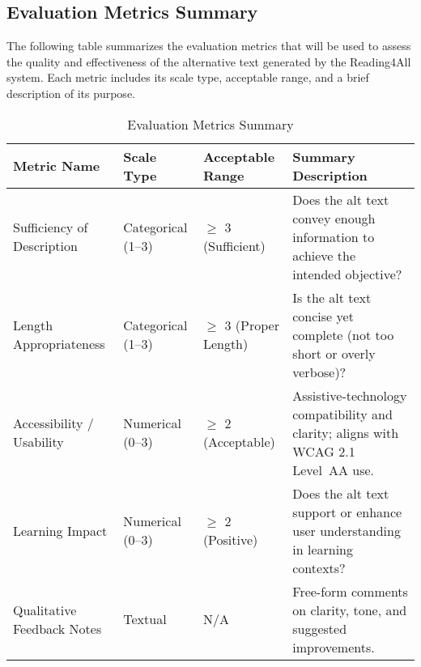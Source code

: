 \documentclass[12pt, titlepage]{article}
\begin{document}
\subsection{Evaluation Metrics Summary}
\label{appendix:evaluation-metrics}
The following table summarizes the evaluation metrics that will be used to assess the quality and effectiveness of the alternative text generated by the Reading4All system. Each metric includes its scale type, acceptable range, and a brief description of its purpose.
\begin{table}[H]
    \centering
    \caption{Evaluation Metrics Summary}
    \label{tab:evaluation-metrics-summary}
    \begin{tabular}{ |p{3.5cm}|p{3cm}|p{3cm}|p{4cm}| }
      \hline
      \textbf{Metric Name} & \textbf{Scale Type} & \textbf{Acceptable Range} & \textbf{Summary Description} \\
      \hline
      Sufficiency of Description
        & Categorical (1--3)
        & $\geq$ 3 (Sufficient)
        & Does the alt text convey enough information to achieve the intended objective? \\
      \hline
      Length Appropriateness
        & Categorical (1--3)
        & $\geq$ 3 (Proper Length)
        & Is the alt text concise yet complete (not too short or overly verbose)? \\
      \hline
      Accessibility / Usability
        & Numerical (0--3)
        & $\geq$ 2 (Acceptable)
        & Assistive-technology compatibility and clarity; aligns with WCAG 2.1 Level~AA use. \\
      \hline
      Learning Impact
        & Numerical (0--3)
        & $\geq$ 2 (Positive)
        & Does the alt text support or enhance user understanding in learning contexts? \\
      \hline
      Qualitative Feedback Notes
        & Textual
        & N/A
        & Free-form comments on clarity, tone, and suggested improvements. \\
      \hline
    \end{tabular}
  \end{table}
\end{document}
